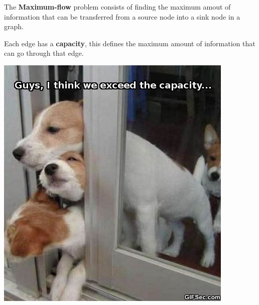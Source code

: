 \documentclass{beamer}
\begin{document}
\begin{frame}[fragile]

The \textbf{Maximum-flow} problem consists of finding the maximum amout of
information that can be transferred from a source node into a sink node in a graph.

\vspace{0.5cm}

Each edge has a \textbf{capacity}, this defines the maximum amount of 
information that can go through that edge.

\begin{center}
\includegraphics[scale=0.3]{capacity.jpg}
\end{center}

\end{frame}
\end{document}
